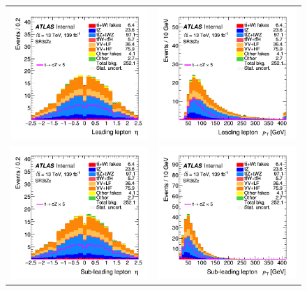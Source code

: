 \begin{figure}[!htbp]
	\centering
	\begin{tabular}{cc}
		\includegraphics[width=.45\textwidth]{Chapters/CH5/figures/SR3_UsingSMT/lep1_eta} &
		\includegraphics[width=.45\textwidth]{Chapters/CH5/figures/SR3_UsingSMT/lep1_pt} \\
		\includegraphics[width=.45\textwidth]{Chapters/CH5/figures/SR3_UsingSMT/lep2_eta} &
		\includegraphics[width=.45\textwidth]{Chapters/CH5/figures/SR3_UsingSMT/lep2_pt} \\

\end{tabular}
\end{figure}
